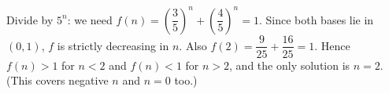 Divide by $5^n$: we need $f(n)=\left(\dfrac35\right)^n+\left(\dfrac45\right)^n=1$. Since both bases lie in $(0,1)$, $f$ is strictly decreasing in $n$. Also $f(2)=\dfrac{9}{25}+\dfrac{16}{25}=1$. Hence $f(n)>1$ for $n<2$ and $f(n)<1$ for $n>2$, and the only solution is $\boxed{n=2}$. (This covers negative $n$ and $n=0$ too.)
